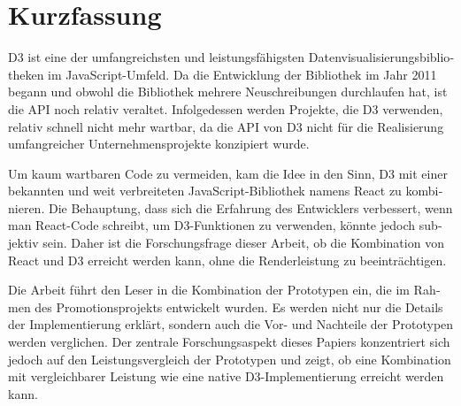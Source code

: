 \chapter{Kurzfassung}

\begin{german}
D3 ist eine der umfangreichsten und leistungsfähigsten Datenvisualisierungsbibliotheken im JavaScript-Umfeld. Da die Entwicklung der Bibliothek im Jahr 2011 begann und obwohl die Bibliothek mehrere Neuschreibungen durchlaufen hat, ist die API noch relativ veraltet. Infolgedessen werden Projekte, die D3 verwenden, relativ schnell nicht mehr wartbar, da die API von D3 nicht für die Realisierung umfangreicher Unternehmensprojekte konzipiert wurde.

Um kaum wartbaren Code zu vermeiden, kam die Idee in den Sinn, D3 mit einer bekannten und weit verbreiteten JavaScript-Bibliothek namens React zu kombinieren. Die Behauptung, dass sich die Erfahrung des Entwicklers verbessert, wenn man React-Code schreibt, um D3-Funktionen zu verwenden, könnte jedoch subjektiv sein. Daher ist die Forschungsfrage dieser Arbeit, ob die Kombination von React und D3 erreicht werden kann, ohne die Renderleistung zu beeinträchtigen.

Die Arbeit führt den Leser in die Kombination der Prototypen ein, die im Rahmen des Promotionsprojekts entwickelt wurden. Es werden nicht nur die Details der Implementierung erklärt, sondern auch die Vor- und Nachteile der Prototypen werden verglichen. Der zentrale Forschungsaspekt dieses Papiers konzentriert sich jedoch auf den Leistungsvergleich der Prototypen und zeigt, ob eine Kombination mit vergleichbarer Leistung wie eine native D3-Implementierung erreicht werden kann.
\end{german}